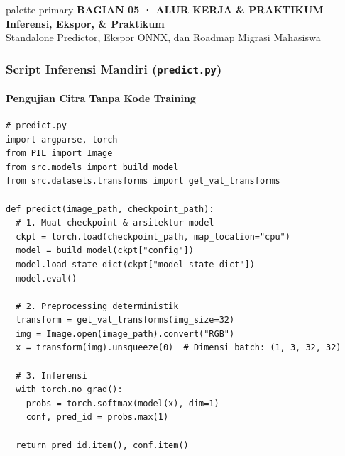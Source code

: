 \documentclass[t,aspectratio=169,xcolor=dvipsnames]{beamer}
\begin{document}
\begin{frame}[plain]
  \begin{beamercolorbox}[wd=\paperwidth,ht=0.96\paperheight,sep=0.8cm]{palette primary}
    \vspace{1.2cm}
    {\scriptsize\bfseries\color{dlMute}BAGIAN 05 · ALUR KERJA \& PRAKTIKUM}\\[0.4cm]
    {\Huge\bfseries Inferensi, Ekspor, \& Praktikum}\\[0.4cm]
    {\small\color{dlHairline}Standalone Predictor, Ekspor ONNX, dan Roadmap Migrasi Mahasiswa}
    \vfill
  \end{beamercolorbox}
\end{frame}

\begin{frame}[fragile]
  \frametitle{Script Inferensi Mandiri (\texttt{predict.py})}
  \framesubtitle{Pengujian Citra Tanpa Kode Training}

\begin{lstlisting}[style=py]
# predict.py
import argparse, torch
from PIL import Image
from src.models import build_model
from src.datasets.transforms import get_val_transforms

def predict(image_path, checkpoint_path):
  # 1. Muat checkpoint & arsitektur model
  ckpt = torch.load(checkpoint_path, map_location="cpu")
  model = build_model(ckpt["config"])
  model.load_state_dict(ckpt["model_state_dict"])
  model.eval()

  # 2. Preprocessing deterministik
  transform = get_val_transforms(img_size=32)
  img = Image.open(image_path).convert("RGB")
  x = transform(img).unsqueeze(0)  # Dimensi batch: (1, 3, 32, 32)

  # 3. Inferensi
  with torch.no_grad():
    probs = torch.softmax(model(x), dim=1)
    conf, pred_id = probs.max(1)

  return pred_id.item(), conf.item()
\end{lstlisting}
\end{frame}
\end{document}
